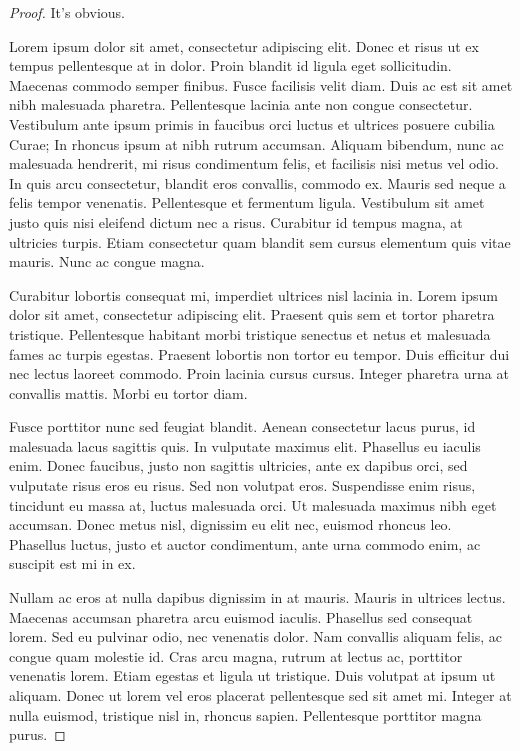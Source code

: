 \documentclass[notitlepage]{article}
\begin{document}
        \begin{proof}
            It's obvious.


Lorem ipsum dolor sit amet, consectetur adipiscing elit. Donec et risus ut ex tempus pellentesque at in dolor. Proin blandit id ligula eget sollicitudin. Maecenas commodo semper finibus. Fusce facilisis velit diam. Duis ac est sit amet nibh malesuada pharetra. Pellentesque lacinia ante non congue consectetur. Vestibulum ante ipsum primis in faucibus orci luctus et ultrices posuere cubilia Curae; In rhoncus ipsum at nibh rutrum accumsan. Aliquam bibendum, nunc ac malesuada hendrerit, mi risus condimentum felis, et facilisis nisi metus vel odio. In quis arcu consectetur, blandit eros convallis, commodo ex. Mauris sed neque a felis tempor venenatis. Pellentesque et fermentum ligula. Vestibulum sit amet justo quis nisi eleifend dictum nec a risus. Curabitur id tempus magna, at ultricies turpis. Etiam consectetur quam blandit sem cursus elementum quis vitae mauris. Nunc ac congue magna.

Curabitur lobortis consequat mi, imperdiet ultrices nisl lacinia in. Lorem ipsum dolor sit amet, consectetur adipiscing elit. Praesent quis sem et tortor pharetra tristique. Pellentesque habitant morbi tristique senectus et netus et malesuada fames ac turpis egestas. Praesent lobortis non tortor eu tempor. Duis efficitur dui nec lectus laoreet commodo. Proin lacinia cursus cursus. Integer pharetra urna at convallis mattis. Morbi eu tortor diam.

Fusce porttitor nunc sed feugiat blandit. Aenean consectetur lacus purus, id malesuada lacus sagittis quis. In vulputate maximus elit. Phasellus eu iaculis enim. Donec faucibus, justo non sagittis ultricies, ante ex dapibus orci, sed vulputate risus eros eu risus. Sed non volutpat eros. Suspendisse enim risus, tincidunt eu massa at, luctus malesuada orci. Ut malesuada maximus nibh eget accumsan. Donec metus nisl, dignissim eu elit nec, euismod rhoncus leo. Phasellus luctus, justo et auctor condimentum, ante urna commodo enim, ac suscipit est mi in ex.

Nullam ac eros at nulla dapibus dignissim in at mauris. Mauris in ultrices lectus. Maecenas accumsan pharetra arcu euismod iaculis. Phasellus sed consequat lorem. Sed eu pulvinar odio, nec venenatis dolor. Nam convallis aliquam felis, ac congue quam molestie id. Cras arcu magna, rutrum at lectus ac, porttitor venenatis lorem. Etiam egestas et ligula ut tristique. Duis volutpat at ipsum ut aliquam. Donec ut lorem vel eros placerat pellentesque sed sit amet mi. Integer at nulla euismod, tristique nisl in, rhoncus sapien. Pellentesque porttitor magna purus.


\end{proof}
\end{document}
